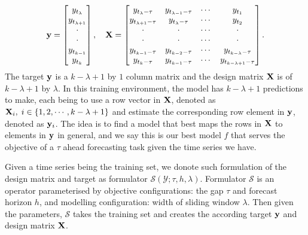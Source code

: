 \begin{equation*}
    \mathbf{y} = \begin{bmatrix}
        y_{t_\lambda}       \\
        y_{t_{\lambda + 1}} \\
        \cdot               \\
        \cdot               \\
        y_{t_{k-1}}         \\
        y_{t_k}             \\
    \end{bmatrix}
    , \quad
    \mathbf{X} = \begin{bmatrix}
        y_{t_{\lambda} - \tau}   & y_{t_{\lambda-1} - \tau} & \cdots & y_{t_{1}} \\
        y_{t_{\lambda+1} - \tau} & y_{t_{\lambda} - \tau}   & \cdots & y_{t_{2}} \\
        \cdot                    & \cdot                    & \cdots & \cdot     \\
        \cdot                    & \cdot                    & \cdots & \cdot     \\
        y_{t_{k-1} - \tau}       & y_{t_{k-2} - \tau}       & \cdots & y_{t_{k - \lambda} - \tau}     \\
        y_{t_{k} - \tau}         & y_{t_{k-1} - \tau}       & \cdots & y_{t_{k - \lambda + 1} - \tau} \\
    \end{bmatrix}.
\end{equation*}
The target $\mathbf{y}$ is a $k-\lambda+1$ by $1$ column matrix and the design matrix $\mathbf{X}$ is of $k-\lambda+1$ by $\lambda$. In this training environment, the model has $k-\lambda + 1$ predictions to make, each being to use a row vector in $\mathbf{X}$, denoted as $\mathbf{X}_i, \; i \in \{1, 2, \cdots, k-\lambda+1 \}$ and estimate the corresponding row element in $\mathbf{y}$, denoted as $\mathbf{y}_i$. The idea is to find a model that best maps the rows in $\mathbf{X}$ to elements in $\mathbf{y}$ in general, and we say this is our best model $f$ that serves the objective of a $\tau$ ahead forecasting task given the time series we have.

Given a time series being the training set, we donote such formulation of the design matrix and target as formulator $\mathcal{S}(\mathcal{Y};\tau, h, \lambda)$. Formulator $\mathcal{S}$ is an operator parameterised by objective configurations: the gap $\tau$ and forecast horizon $h$, and modelling configuration: width of sliding window $\lambda$. Then given the parameters, $\mathcal{S}$ takes the training set and creates the according target $\mathbf{y}$ and design matrix $\mathbf{X}$.

